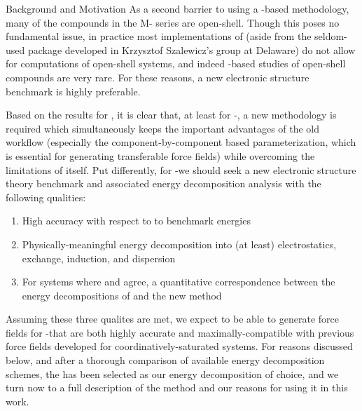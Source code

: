 \begin{section}{Background and Motivation}
As a second barrier to using a \sapt-based methodology, many of the compounds in the M- series are
open-shell. Though this poses no fundamental issue, 
in practice most implementations of \sapt (aside from the
seldom-used  package developed in Krzysztof Szalewicz's group at
Delaware) do not allow for computations of open-shell systems, and indeed
\sapt-based studies of open-shell compounds are very
rare.\cite{Zuchowski2008a} For these reasons, a new electronic structure
benchmark is highly preferable.

Based on the results for \mgmof, it is clear that, at least for \cus-\mofs, a
new methodology is required which simultaneously keeps the important advantages of the
old workflow (especially the component-by-component based parameterization,
which is essential for generating transferable force fields) while overcoming
the limitations of \sapt itself. Put differently, for \cus-\mofs we should
seek a new electronic structure theory benchmark and associated energy
decomposition analysis with the following qualities:
%
\begin{enumerate}
\item High accuracy with respect to to \ccsdtf benchmark energies
\item Physically-meaningful energy decomposition into (at least)
electrostatics, exchange, induction, and dispersion
\item For systems where \sapt and \ccsdtf agree, a quantitative correspondence
between the energy decompositions of \sapt and the new method
\end{enumerate}
%
Assuming these three qualites are met, we expect to be able to generate force
fields for \cus-\mofs that are both highly accurate and maximally-compatible
with previous force fields developed for coordinatively-saturated \mof
systems. For reasons discussed below, and after a thorough comparison of
available energy decomposition schemes, the \lmoeda\cite{Su2009,Chen2010} has been selected as our
energy decomposition of choice, and we turn now to a full description of the
method and our reasons for using it in this work.

\end{section}


